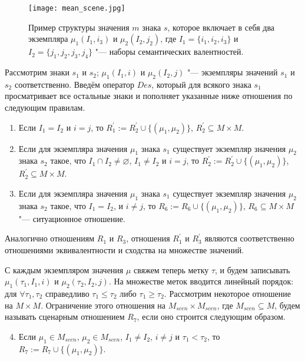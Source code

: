 \begin{figure}[h]
	\centering
	\texttt{[image: mean\_scene.jpg]}
	\caption{Пример структуры значения $m$ знака $s$, которое включает в себя два экземпляра $\mu_1(I_1, i_3)$ и $\mu_2(I_2, j_2)$, где $I_1=\{i_1,i_2,i_3\}$ и $I_2=\{j_1,j_2,j_3,j_4\}$ "--- наборы семантических валентностей.}
	\label{fg:mean_scene}
\end{figure}

Рассмотрим знаки $s_1$ и $s_2$; $\mu_1(I_1,i)$ и $\mu_2(I_2,j)$ "--- экземпляры значений $s_1$ и $s_2$ соответственно. Введём оператор $Des$, который для всякого знака $s_1$ просматривает все остальные знаки и пополняет указанные ниже отношения по следующим правилам.
\begin{enumerate}
	\renewcommand\labelenumi{\theenumi.}
	\item Если $I_1=I_2$ и $i=j$, то $R_1^\prime:=R_2^\prime\cup\{(\mu_1,\mu_2)\}$, $R_2^\prime\subseteq M\times M$.
	\item Если для экземпляра значения $\mu_1$ знака $s_1$ существует экземпляр значения $\mu_2$ знака $s_2$ такое, что $I_1\cap I_2\not =\varnothing$, $I_1\not =I_2$ и $i=j$, то $R_2^\prime:=R_2^\prime\cup\{(\mu_1,\mu_2)\}$, $R_2^\prime\subseteq M\times M$.
	\item Если для экземпляра значения $\mu_1$ знака $s_1$ существует экземпляр значения $\mu_2$ знака $s_2$ такое, что $I_1=I_2$, и $i\not =j$, то $R_6:=R_6\cup\{(\mu_1,\mu_2)\}$, $R_6\subseteq M\times M$ "--- ситуационное отношение.
\end{enumerate}
Аналогично отношениям $R_1$ и $R_3$, отношения $R_1^\prime$ и $R_3^\prime$ являются соответственно отношениями эквивалентности и сходства на множестве значений. 

С каждым экземпляром значения $\mu$ свяжем теперь метку $\tau$, и будем записывать $\mu_1(\tau_1,I_1,i)$ и $\mu_2(\tau_2,I_2,j)$. На множестве меток вводится линейный порядок: для $\forall\tau_1,\tau_2$ справедливо $\tau_1\leqslant\tau_2$ либо $\tau_1\geqslant\tau_2$. Рассмотрим некоторое отношение на $M\times M$. Ограничение этого отношения на $M_{scen}\times M_{scen}$, где $M_{scen}\subseteq M$, будем называть сценарным отношением $R_7$, если оно строится следующим образом.
\begin{enumerate}
	\setcounter{enumi}{3}
	\renewcommand\labelenumi{\theenumi.}
	\item Если $\mu_1\in M_{scen}$, $\mu_2\in M_{scen}$, $I_1\not =I_2$, $i\not =j$ и $\tau_1<\tau_2$, то $R_7:=R_7\cup\{(\mu_1,\mu_2)\}$.
\end{enumerate}	

